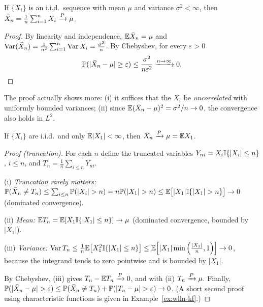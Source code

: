 \documentclass[main.tex]{subfiles}
\begin{document}
\begin{theorem}\label{thm:wlln}
If $\{X_i\}$ is an i.i.d.\ sequence with mean $\mu$ and variance $\sigma^2 < \infty$, then $\bar{X}_n=\frac1n\sum_{i=1}^nX_i \pto \mu$.
\end{theorem}
\begin{proof}
By linearity and independence, $\E\bar X_n=\mu$ and $\Var(\bar{X}_n) = \frac{1}{n^2}\sum_{i=1}^n\Var X_i=\frac{\sigma^2}{n}$. By Chebyshev, for every $\varepsilon>0$
\[
\P(|\bar{X}_n - \mu| \ge \varepsilon) \le \frac{\sigma^2}{n\varepsilon^2} \xrightarrow{n \to \infty} 0. \qedhere
\]
\end{proof}

\begin{remark}
The proof actually shows more: (i) it suffices that the $X_i$ be \emph{uncorrelated} with uniformly bounded variances; (ii) since $\E(\bar X_n-\mu)^2=\sigma^2/n\to0$, the convergence also holds in $L^2$.
\end{remark}

\begin{theorem}\label{thm:khinchin}
If $\{X_i\}$ are i.i.d.\ and only $\E|X_1|<\infty$, then $\bar X_n\pto\mu=\E X_1$.
\end{theorem}
\begin{proof}[Proof (truncation)]
For each $n$ define the truncated variables $Y_{ni}=X_i\I\{|X_i|\le n\}$, $i\le n$, and $T_n=\frac1n\sum_{i\le n}Y_{ni}$.

(i) \emph{Truncation rarely matters:} $\P(\bar X_n\ne T_n)\le\sum_{i\le n}\P(|X_i|>n)=n\P(|X_1|>n)\le\E\big[|X_1|\I\{|X_1|>n\}\big]\to0$ (dominated convergence).

(ii) \emph{Mean:} $\E T_n=\E[X_1\I\{|X_1|\le n\}]\to\mu$ (dominated convergence, bounded by $|X_1|$).

(iii) \emph{Variance:} $\Var T_n\le\frac1n\E\big[X_1^2\I\{|X_1|\le n\}\big]\le\E\Big[|X_1|\min\Big(\frac{|X_1|}{n},1\Big)\Big]\to0$, because the integrand tends to zero pointwise and is bounded by $|X_1|$.

By Chebyshev, (iii) gives $T_n-\E T_n\pto0$, and with (ii) $T_n\pto\mu$. Finally, $\P(|\bar X_n-\mu|>\varepsilon)\le\P(\bar X_n\ne T_n)+\P(|T_n-\mu|>\varepsilon)\to0$. (A short second proof using characteristic functions is given in Example~\ref{ex:wlln-kf}.)
\end{proof}
\end{document}
